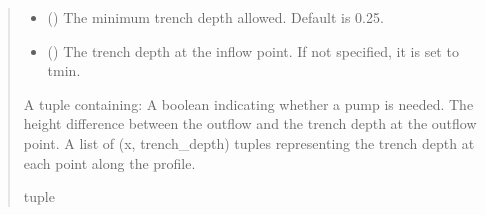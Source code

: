 \documentclass[letterpaper,10pt,english]{sphinxmanual}
\begin{document}
\begin{fulllineitems}
\begin{quote}
\begin{description}
\begin{itemize}
\item {} 
\sphinxAtStartPar
{} (\sphinxstyleliteralemphasis{\sphinxupquote{, }}) \textendash{} The minimum trench depth allowed. Default is 0.25.

\item {} 
\sphinxAtStartPar
{} (\sphinxstyleliteralemphasis{\sphinxupquote{, }}) \textendash{} The trench depth at the inflow point. If not specified, it is set to tmin.

\end{itemize}

\sphinxAtStartPar
A tuple containing:
\sphinxhyphen{} A boolean indicating whether a pump is needed.
\sphinxhyphen{} The height difference between the outflow and the trench depth at the outflow point.
\sphinxhyphen{} A list of (x, trench\_depth) tuples representing the trench depth at each point along the profile.

\sphinxAtStartPar
tuple

\end{description}\end{quote}

\end{fulllineitems}

\end{document}

